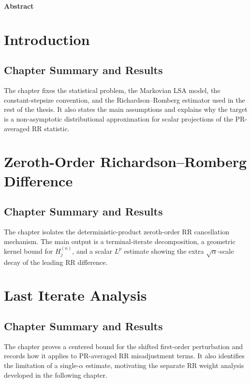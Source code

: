 \documentclass[11pt,a4paper,oneside]{report}
\numberwithin{equation}{chapter}
\begin{document}
\clearpage
\thispagestyle{empty}
\begin{center}
  {\bfseries\large Abstract}
\end{center}
\englishabstract

\clearpage
\hypersetup{pageanchor=true}
\tableofcontents

\chapter{Introduction}\label{sec:introduction}


\section{Chapter Summary and Results}
The chapter fixes the statistical problem, the Markovian LSA model, the
constant-stepsize convention, and the Richardson--Romberg estimator used in
the rest of the thesis. It also states the main assumptions and explains why
the target is a non-asymptotic distributional approximation for scalar
projections of the PR-averaged RR statistic.

\chapter{Zeroth-Order Richardson--Romberg Difference}
\label{sec:zeroth_order_rr}


\section{Chapter Summary and Results}
The chapter isolates the deterministic-product zeroth-order RR cancellation
mechanism. The main output is a terminal-iterate decomposition, a geometric
kernel bound for $H_j^{(n)}$, and a scalar $L^p$ estimate showing the extra
$\sqrt\alpha$-scale decay of the leading RR difference.

\chapter{Last Iterate Analysis}\label{sec:last_iterate}


\section{Chapter Summary and Results}
The chapter proves a centered bound for the shifted first-order perturbation
and records how it applies to PR-averaged RR misadjustment terms. It also
identifies the limitation of a single-$\alpha$ estimate, motivating the
separate RR weight analysis developed in the following chapter.
\end{document}
